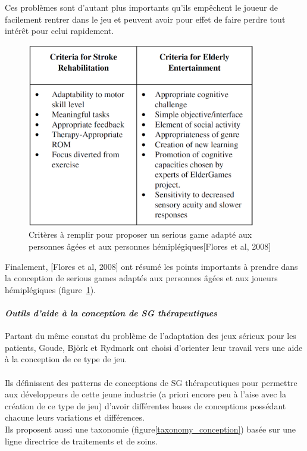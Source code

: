 Ces problèmes sont d'autant plus importants qu'ils empêchent le joueur de facilement rentrer dans le jeu et peuvent avoir pour effet de faire perdre tout intérêt pour celui rapidement.
\begin{figure}
	\centering
	\includegraphics[width=10cm]{images/param_jeux_adaptes.png}
	\caption{Critères à remplir pour proposer un serious game adapté aux personnes âgées et aux personnes hémiplégiques[Flores et al, 2008]\cite{Flor08}}
	\label{param_jeux_adaptes}
\end{figure}

Finalement, [Flores et al, 2008]\cite{Flor08} ont résumé les points importants à prendre dans la conception de serious games adaptés aux personnes âgées et aux joueurs hémiplégiques (figure~\ref{param_jeux_adaptes}).

\paragraph{\emph{Outils d'aide à la conception de SG thérapeutiques}\\}
Partant du même constat du problème de l'adaptation des jeux sérieux pour les patients, Goude, Björk et Rydmark\cite{Goud07} ont choisi d'orienter leur travail vers une aide à la conception de ce type de jeu.

\paragraph{}
Ils définissent des patterns de conceptions de SG thérapeutiques pour permettre aux développeurs de cette jeune industrie (a priori encore peu à l'aise avec la création de ce type de jeu) d'avoir différentes bases de conceptions possédant chacune leurs variations et différences.\\
Ils proposent aussi une taxonomie (figure\ref{taxonomy_conception}) basée sur une ligne directrice de traitements et de soins. 

